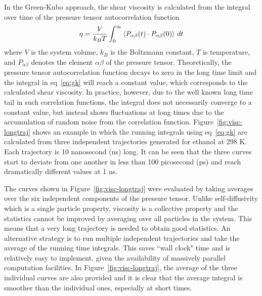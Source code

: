 \documentclass[12pt]{article}
\begin{document}
In the Green-Kubo approach,
the shear viscosity is calculated from the integral over time of the pressure tensor autocorrelation function 
\cite{ComputerSimulationOfLiquids}
\begin{equation}
{\eta = {V \over k_B T } \int_0 ^{\infty}{\langle P_{\alpha\beta}(t) \cdot P_{\alpha\beta}(0) \rangle \ dt} }
\label{eq:gk}
\end{equation}
where $V$ is the system volume,
$k_B$ is the Boltzmann constant,
$T$ is temperature, and 
$P_{\alpha\beta}$ denotes the element $\alpha\beta$ of the pressure tensor.
Theoretically,
the pressure tensor autocorrelation function decays to zero in the long time limit
and the integral in eq~\ref{eq:gk} will reach a constant value,
which corresponds to the calculated shear viscosity.
In practice, however, 
due to the well known long time tail in such correlation functions,
\cite{Verlet.PRA.7.1690.1973}
the integral does not necessarily converge to a constant value, but instead shows fluctuations at long times due to the accumulation of random noise from the correlation function. 
Figure~\ref{fig:visc-longtraj} shows an example in which the running integrals using eq~\ref{eq:gk} are calculated from three independent trajectories generated for ethanol at 298 K. 
Each trajectory is 10 nanosecond (ns) long.
It can be seen that the three curves start to deviate from one another in less than 100 picosecond (ps)
and reach dramatically different values at 1 ns.

The curves shown in Figure~\ref{fig:visc-longtraj} were evaluated by taking averages over the six independent components of the pressure tensor. \cite{Evans.JCP.100.541.1994,Hess.JCP.116.209.2002} Unlike self-diffusivity which is a single particle property,
viscosity is a collective property and 
the statistics cannot be improved by averaging over all particles in the system. This means that a very long trajectory is needed to obtain good statistics.
An alternative strategy is to run multiple independent trajectories and take the average of the running time integrals.
\cite{Gasser.JCP.136.094501.2012,
Bala.JCED.59.3061.2014}
This saves ``wall clock" time and is relatively easy to implement, given the availability of massively parallel computation facilities.
In Figure~\ref{fig:visc-longtraj},
the average of the three individual curves are also provided
and it is clear that the average integral is smoother than the individual ones, especially at short times.
\end{document}
